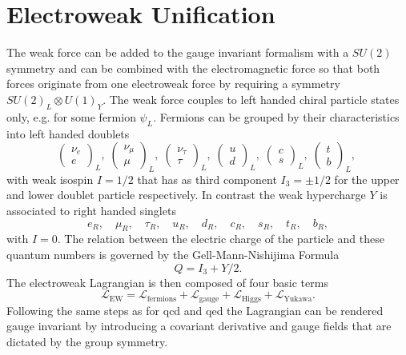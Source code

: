 \section{Electroweak Unification}\label{sec:ew}
The weak force can be added to the gauge invariant formalism with a $SU(2)$ symmetry and can be combined with the electromagnetic force so that both forces originate from one electroweak force by requiring a symmetry $SU(2)_L \otimes U(1)_Y$. The weak force couples to left handed chiral particle states only, e.g. for some fermion $\psi_L$. Fermions can be grouped by their characteristics into left handed doublets
\begin{equation}
    \begin{pmatrix}
        \nu_e \\ e
    \end{pmatrix}_L, \;
    \begin{pmatrix}
        \nu_\mu \\ \mu
    \end{pmatrix}_L, \;
    \begin{pmatrix}
        \nu_\tau \\ \tau
    \end{pmatrix}_L, \;
    \begin{pmatrix}
        u \\ d
    \end{pmatrix}_L, \;
    \begin{pmatrix}
        c \\ s
    \end{pmatrix}_L, \;
    \begin{pmatrix}
        t \\ b
    \end{pmatrix}_L, \;
    \label{eq:weak_doublets}
\end{equation}
with weak isospin $I=1/2$ that has as third component $I_3=\pm1/2$ for the upper and lower doublet particle respectively. In contrast the weak hypercharge $Y$ is associated to right handed singlets
\begin{equation}
    e_R    ,\quad \mu_R ,\quad    \tau_R ,\quad    u_R,\quad d_R ,\quad    c_R ,\quad s_R ,\quad    t_R ,\quad b_R,
\end{equation}
with $I=0$. The relation between the electric charge of the particle and these quantum numbers is governed by the Gell-Mann-Nishijima Formula
\begin{equation}
    Q=I_3+Y/2.
    \label{eq:gellmann_nishijima_formula}
\end{equation}
The electroweak Lagrangian is then composed of four basic terms
\begin{equation}
    \mathcal{L}_\mathrm{EW} = \mathcal{L}_\mathrm{fermions}+\mathcal{L}_\mathrm{gauge}+\mathcal{L}_\mathrm{Higgs}+\mathcal{L}_\mathrm{Yukawa}.
    \label{eq:L_EW}
\end{equation}
Following the same steps as for \ac{qcd} and \ac{qed} the Lagrangian can be rendered gauge invariant by introducing a covariant derivative and gauge fields that are dictated by the group symmetry.

